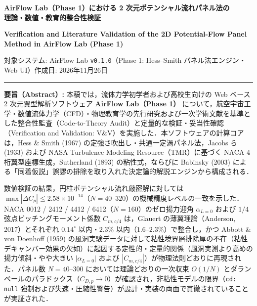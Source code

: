 \documentclass[10pt,a4paper]{article}
\begin{document}
\begin{center}
  {\Large\sffamily\bfseries\color{navy} AirFlow Lab（Phase 1）における 2 次元ポテンシャル流れパネル法の\\理論・数値・教育的整合性検証}\par\vspace{2.5mm}
  {\normalsize\bfseries Verification and Literature Validation of the 2D Potential-Flow Panel Method in AirFlow Lab (Phase 1)}\par\vspace{2.0mm}
  {\small 対象システム: AirFlow Lab \texttt{v0.1.0}（Phase 1: Hess--Smith パネル法エンジン・Web UI）\quad 作成日: \mbox{2026年11月26日}}
\end{center}
\vspace{1.5mm}

\noindent\rule{\textwidth}{0.8pt}

\vspace{1.5mm}
\noindent\textbf{要旨（Abstract）:}\quad
本稿では，流体力学初学者および高校生向けの Web ベース 2 次元翼型解析ソフトウェア \textbf{AirFlow Lab（Phase 1）} について，航空宇宙工学・数値流体力学（CFD）・物理教育学の先行研究および一次学術文献を基準とした整合性監査（Code-to-Theory Audit）と定量的な検証・妥当性確認（Verification and Validation: V\&V）を実施した．本ソフトウェアの計算コアは，Hess \& Smith (1967) の定強さ吹出し・共通一定渦パネル法，Jacobs ら (1933) および NASA Turbulence Modeling Resource（TMR）に基づく NACA 4 桁翼型座標生成，Sutherland (1893) の粘性式，ならびに Babinsky (2003) による「同着仮説」誤謬の排除を取り入れた決定論的解説エンジンから構成される．

数値検証の結果，円柱ポテンシャル流れ厳密解に対しては $\max|\Delta C_p| \le 2.58\times 10^{-14}$（$N=40\text{--}320$）の機械精度レベルの一致を示した．NACA 0012 / 2412 / 4412 / 6412（$N=160$）のゼロ揚力迎角 $\alpha_{L=0}$ および $1/4$ 弦点ピッチングモーメント係数 $C_{m,c/4}$ は，Glauert の薄翼理論（Anderson, 2017）とそれぞれ $0.14^\circ$ 以内・$2.3\%$ 以内（$1.6\text{--}2.3\%$）で整合し，かつ Abbott \& von Doenhoff (1959) の風洞実験データに対して粘性境界層排除厚の不在（粘性デキャンバー効果の欠如）に起因する定性的・定量的関係（風洞実測より高めの揚力傾斜・やや大きい $|\alpha_{L=0}|$ および $|C_{m,c/4}|$）が物理法則どおりに再現された．パネル数 $N=40\text{--}300$ においては理論どおりの一次収束 $O(1/N)$ とダランベールのパラドックス（$C_{D,p} \to 0$）が確認され，非粘性モデルの限界（\texttt{cd: null} 強制および失速・圧縮性警告）が設計・実装の両面で貫徹されていることが実証された．
\end{document}
